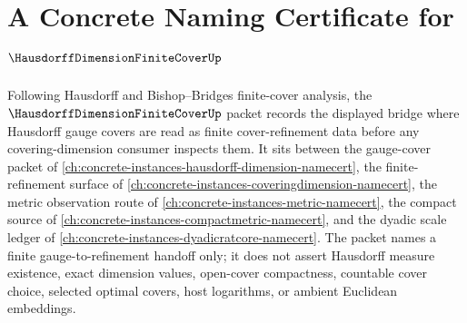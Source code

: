 \chapter{A Concrete Naming Certificate for $\HausdorffDimensionFiniteCoverUp$}
\label{ch:concrete-instances-hausdorff-dimension-finite-cover-namecert}

Following Hausdorff and Bishop--Bridges finite-cover analysis, the $\HausdorffDimensionFiniteCoverUp$ packet records the displayed bridge where Hausdorff gauge covers are read as finite cover-refinement data before any covering-dimension consumer inspects them. It sits between the gauge-cover packet of \autoref{ch:concrete-instances-hausdorff-dimension-namecert}, the finite-refinement surface of \autoref{ch:concrete-instances-coveringdimension-namecert}, the metric observation route of \autoref{ch:concrete-instances-metric-namecert}, the compact source of \autoref{ch:concrete-instances-compactmetric-namecert}, and the dyadic scale ledger of \autoref{ch:concrete-instances-dyadicratcore-namecert}. The packet names a finite gauge-to-refinement handoff only; it does not assert Hausdorff measure existence, exact dimension values, open-cover compactness, countable cover choice, selected optimal covers, host logarithms, or ambient Euclidean embeddings.

